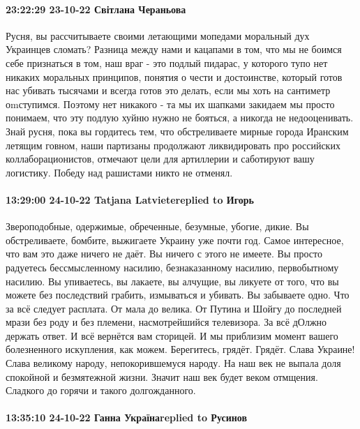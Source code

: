 \paragraph{23:22:29 23-10-22 Світлана Чераньова}

Русня, вы рассчитываете своими летающими мопедами моральный дух Украинцев сломать? Разница между нами и кацапами в том, что мы не боимся себе признаться в том, наш враг - это подлый пидарас, у которого тупо нет никаких моральных принципов, понятия о чести и достоинстве, который готов нас убивать тысячами и всегда готов это делать, если мы хоть на сантиметр оmступимся. Поэтому нет никакого
- та мы их шапками закидаем
мы просто понимаем, что эту подлую хуйню нужно не бояться, а никогда не недооценивать.
Знай русня, пока вы гордитесь тем, что обстреливаете мирные города Иранским летящим говном, наши партизаны продолжают ликвидировать про российских коллаборационистов, отмечают цели для артиллерии и саботируют вашу логистику. Победу над рашистами никто не отменял.

\paragraph{13:29:00 24-10-22 Tatjana Latvietereplied to Игорь}

Звероподобные, одержимые, обреченные, безумные, убогие, дикие.
Вы обстреливаете, бомбите, выжигаете Украину уже почти год.
Самое интересное, что вам это даже ничего не даёт. Вы ничего с этого не имеете.
Вы просто радуетесь бессмысленному насилию, безнаказанному насилию, первобытному насилию.
Вы упиваетесь, вы лакаете, вы алчущие, вы ликуете от того, что вы можете без последствий грабить, измываться и убивать.
Вы забываете одно.
Что за всё следует расплата.
От мала до велика.
От Путина и Шойгу до последней мрази без роду и без племени, насмотрейшийся телевизора.
За всё дОлжно держать ответ.
И всё вернётся вам сторицей.
И мы приблизим момент вашего болезненного искупления, как можем.
Берегитесь, грядёт. Грядёт.
Слава Украине! Слава великому народу, непокорившемуся народу.
На наш век не выпала доля спокойной и безмятежной жизни. Значит наш век будет веком отмщения.
Сладкого до горячи и такого долгожданного.

\paragraph{13:35:10 24-10-22 Ганна Українаreplied to Русинов}


